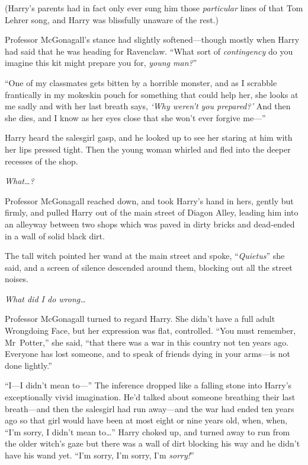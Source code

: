 (Harry’s parents had in fact only ever sung him those \emph{particular} lines of that Tom Lehrer song, and Harry was blissfully unaware of the rest.)

Professor McGonagall’s stance had slightly softened—though mostly when Harry had said that he was heading for Ravenclaw. “What sort of \emph{contingency} do you imagine this kit might prepare you for, \emph{young man?}”

“One of my classmates gets bitten by a horrible monster, and as I scrabble frantically in my mokeskin pouch for something that could help her, she looks at me sadly and with her last breath says, \emph{‘Why weren’t you prepared?’} And then she dies, and I know as her eyes close that she won’t ever forgive me—”

Harry heard the salesgirl gasp, and he looked up to see her staring at him with her lips pressed tight. Then the young woman whirled and fled into the deeper recesses of the shop.

\emph{What…?}

Professor McGonagall reached down, and took Harry’s hand in hers, gently but firmly, and pulled Harry out of the main street of Diagon Alley, leading him into an alleyway between two shops which was paved in dirty bricks and dead-ended in a wall of solid black dirt.

The tall witch pointed her wand at the main street and spoke, “\emph{Quietus}” she said, and a screen of silence descended around them, blocking out all the street noises.

\emph{What did I do wrong…}

Professor McGonagall turned to regard Harry. She didn’t have a full adult Wrongdoing Face, but her expression was flat, controlled. “You must remember, Mr~Potter,” she said, “that there was a war in this country not ten years ago. Everyone has lost someone, and to speak of friends dying in your arms—is not done lightly.”

“I—I didn’t mean to—” The inference dropped like a falling stone into Harry’s exceptionally vivid imagination. He’d talked about someone breathing their last breath—and then the salesgirl had run away—and the war had ended ten years ago so that girl would have been at most eight or nine years old, when, when, “I’m sorry, I didn’t mean to…” Harry choked up, and turned away to run from the older witch’s gaze but there was a wall of dirt blocking his way and he didn’t have his wand yet. “I’m sorry, I’m sorry, I’m \emph{sorry!}”

